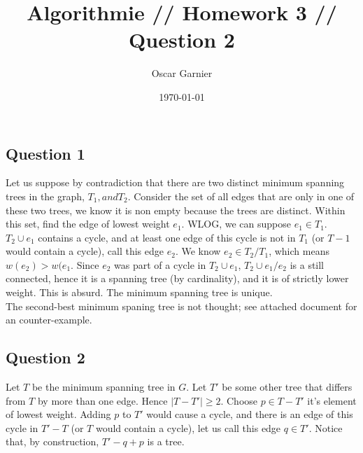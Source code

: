 \documentclass{scrartcl}
\title{Algorithmie // Homework 3 // Question 2}
\author{Oscar Garnier}
\date{\today}
\begin{document}
\newcommand{\E}[1]{\section*{Exo #1}}
\newcommand{\CR}[2]{\section*{#1 // note : #2}}
\newcommand{\Q}[1]{\section*{Exercise #1}}
\newcommand{\SQ}[1]{\subsection*{Question #1}}
\maketitle

\SQ{1}

Let us suppose by contradiction that there are two distinct minimum spanning trees in the graph, \( T_1, and T_2 \). 
Consider the set of all edges that are only in one of these two trees, we know it is non empty because the trees are distinct. 
Within this set, find the edge of lowest weight \( e_1 \). WLOG, we can suppose \( e_1 \in T_1 \). \( T_2 \cup e_1 \) contains a cycle, and at least one edge of this cycle is not in \( T_1 \) (or \( T-1 \) would contain a cycle), call this edge \( e_2 \). We know \( e_2 \in T_2 / T_1 \), which means \(w(e_2) > w(e_1 \). Since \( e_2 \) was part of a cycle in \( T_2 \cup e_1 \), \( T_2 \cup e_1 /e_2 \) is a still connected, hence it is a spanning tree (by cardinality), and it is of strictly lower weight. This is absurd.
The minimum spanning tree is unique. \\

The second-best minimum spaning tree is not thought; see attached document for an counter-example.

\SQ{2}

Let \( T \)  be the minimum spanning tree in \( G \). Let \( T' \) be some other tree that differs from \( T \) by more than one edge. Hence \( |T - T'| \geq 2 \). Choose \( p \in T - T'\) it's element of lowest weight.
Adding \( p \) to \( T' \) would cause a cycle, and there is an edge of this cycle in \( T' - T\) (or \( T \) would contain a cycle), let us call this edge \( q \in T' \).
Notice that, by construction, \( T' - q + p \) is a tree. \\
\end{document}
